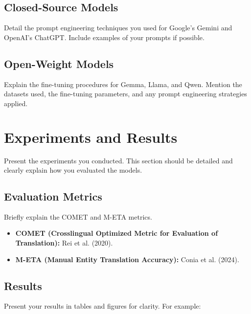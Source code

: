 \documentclass{ecai}
\begin{document}
\subsection{Closed-Source Models}
Detail the prompt engineering techniques you used for Google's Gemini and OpenAI's ChatGPT. Include examples of your prompts if possible.

\subsection{Open-Weight Models}
Explain the fine-tuning procedures for Gemma, Llama, and Qwen. Mention the datasets used, the fine-tuning parameters, and any prompt engineering strategies applied.

\section{Experiments and Results}
\label{sec:experiments}
Present the experiments you conducted. This section should be detailed and clearly explain how you evaluated the models.

\subsection{Evaluation Metrics}
Briefly explain the COMET and M-ETA metrics.
\begin{itemize}
    \item \textbf{COMET (Crosslingual Optimized Metric for Evaluation of Translation):} Rei et al. (2020).\cite{conia-etal-2024-m-eta}
    \item \textbf{M-ETA (Manual Entity Translation Accuracy):} Conia et al. (2024).\cite{rei-etal-2020-comet}
\end{itemize}

\subsection{Results}
Present your results in tables and figures for clarity. For example:
\end{document}
